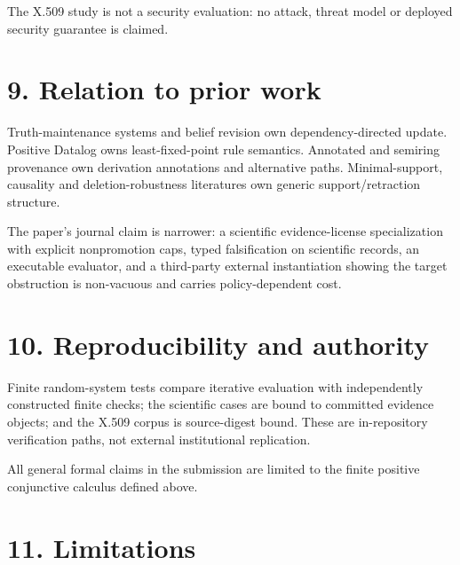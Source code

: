 \documentclass[11pt]{article}
\begin{document}
The X.509 study is not a security evaluation: no attack, threat model or
deployed security guarantee is claimed.

\hypertarget{relation-to-prior-work}{%
\section{9. Relation to prior work}\label{relation-to-prior-work}}

Truth-maintenance systems and belief revision own dependency-directed
update. Positive Datalog owns least-fixed-point rule semantics.
Annotated and semiring provenance own derivation annotations and
alternative paths. Minimal-support, causality and deletion-robustness
literatures own generic support/retraction structure.

The paper's journal claim is narrower: a scientific evidence-license
specialization with explicit nonpromotion caps, typed falsification on
scientific records, an executable evaluator, and a third-party external
instantiation showing the target obstruction is non-vacuous and carries
policy-dependent cost.

\hypertarget{reproducibility-and-authority}{%
\section{10. Reproducibility and
authority}\label{reproducibility-and-authority}}

Finite random-system tests compare iterative evaluation with
independently constructed finite checks; the scientific cases are bound
to committed evidence objects; and the X.509 corpus is source-digest
bound. These are in-repository verification paths, not external
institutional replication.

All general formal claims in the submission are limited to the finite
positive conjunctive calculus defined above.

\hypertarget{limitations}{%
\section{11. Limitations}\label{limitations}}
\end{document}
